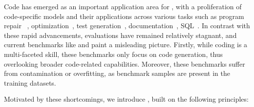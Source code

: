 
Code has emerged as an important application area for \llms{}, with a proliferation of code-specific models 
\citep{chen2021evaluating,austin2021program, 
nijkamp2022codegen, li2023starcoder, roziere2023code, deepseek-coder,  ridnik2024code, starcoder2} and their applications across various tasks such as program repair ~\citep{opencodeinterpreter, olausson2023demystifying}, optimization~\citep{madaan2023learning}, test generation~\citep{steenhoek2023reinforcement}, documentation~\citep{luo2024repoagent}, SQL~\citep{sun2023sql}.
In contrast with these rapid advancements, evaluations have remained relatively stagnant, and current benchmarks like 
\humaneval{} and \mbpp{} paint a misleading picture.
Firstly, while coding is a multi-faceted skill, these benchmarks only focus on code generation, thus overlooking broader code-related capabilities. 
Moreover, these benchmarks suffer from contamination or overfitting, as benchmark samples are present in the training datasets.

% 
Motivated by these shortcomings, we introduce \livecodebench{}, built on the following principles:

